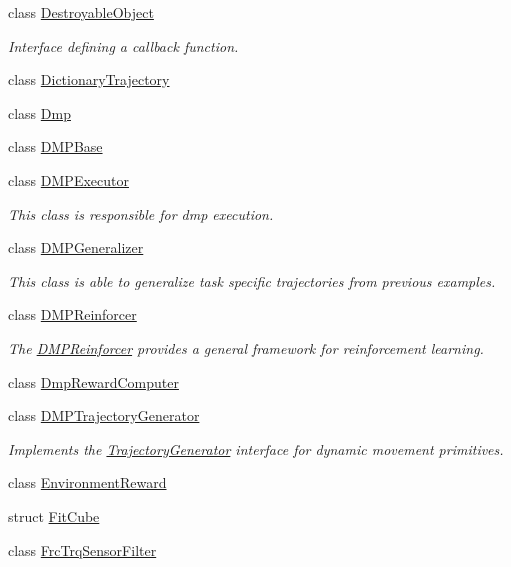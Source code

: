 \begin{DoxyCompactItemize}
class \hyperlink{classkukadu_1_1DestroyableObject}{Destroyable\+Object}
\begin{DoxyCompactList}\small\item\em Interface defining a callback function. \end{DoxyCompactList}\item 
class \hyperlink{classkukadu_1_1DictionaryTrajectory}{Dictionary\+Trajectory}
\item 
class \hyperlink{classkukadu_1_1Dmp}{Dmp}
\item 
class \hyperlink{classkukadu_1_1DMPBase}{D\+M\+P\+Base}
\item 
class \hyperlink{classkukadu_1_1DMPExecutor}{D\+M\+P\+Executor}
\begin{DoxyCompactList}\small\item\em This class is responsible for dmp execution. \end{DoxyCompactList}\item 
class \hyperlink{classkukadu_1_1DMPGeneralizer}{D\+M\+P\+Generalizer}
\begin{DoxyCompactList}\small\item\em This class is able to generalize task specific trajectories from previous examples. \end{DoxyCompactList}\item 
class \hyperlink{classkukadu_1_1DMPReinforcer}{D\+M\+P\+Reinforcer}
\begin{DoxyCompactList}\small\item\em The \hyperlink{classkukadu_1_1DMPReinforcer}{D\+M\+P\+Reinforcer} provides a general framework for reinforcement learning. \end{DoxyCompactList}\item 
class \hyperlink{classkukadu_1_1DmpRewardComputer}{Dmp\+Reward\+Computer}
\item 
class \hyperlink{classkukadu_1_1DMPTrajectoryGenerator}{D\+M\+P\+Trajectory\+Generator}
\begin{DoxyCompactList}\small\item\em Implements the \hyperlink{classkukadu_1_1TrajectoryGenerator}{Trajectory\+Generator} interface for dynamic movement primitives. \end{DoxyCompactList}\item 
class \hyperlink{classkukadu_1_1EnvironmentReward}{Environment\+Reward}
\item 
struct \hyperlink{structkukadu_1_1FitCube}{Fit\+Cube}
\item 
class \hyperlink{classkukadu_1_1FrcTrqSensorFilter}{Frc\+Trq\+Sensor\+Filter}

\end{DoxyCompactItemize}
